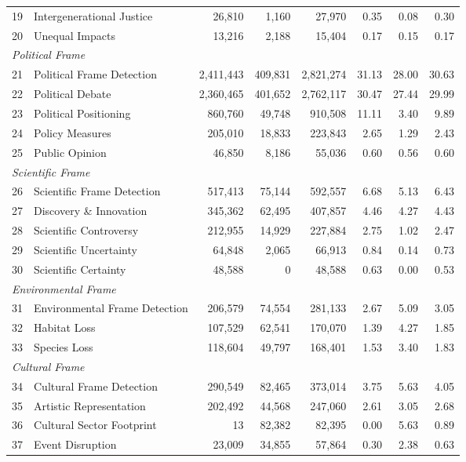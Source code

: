 \documentclass[12pt]{article}
\begin{document}
{\begin{longtable}{p{0.5cm}p{5.5cm}rrrrrr}
19 & Intergenerational Justice & 26,810 & 1,160 & 27,970 & 0.35 & 0.08 & 0.30 \\
20 & Unequal Impacts & 13,216 & 2,188 & 15,404 & 0.17 & 0.15 & 0.17 \\
\midrule
\multicolumn{8}{l}{\textit{Political Frame}} \\
21 & Political Frame Detection & 2,411,443 & 409,831 & 2,821,274 & 31.13 & 28.00 & 30.63 \\
22 & Political Debate & 2,360,465 & 401,652 & 2,762,117 & 30.47 & 27.44 & 29.99 \\
23 & Political Positioning & 860,760 & 49,748 & 910,508 & 11.11 & 3.40 & 9.89 \\
24 & Policy Measures & 205,010 & 18,833 & 223,843 & 2.65 & 1.29 & 2.43 \\
25 & Public Opinion & 46,850 & 8,186 & 55,036 & 0.60 & 0.56 & 0.60 \\
\midrule
\multicolumn{8}{l}{\textit{Scientific Frame}} \\
26 & Scientific Frame Detection & 517,413 & 75,144 & 592,557 & 6.68 & 5.13 & 6.43 \\
27 & Discovery \& Innovation & 345,362 & 62,495 & 407,857 & 4.46 & 4.27 & 4.43 \\
28 & Scientific Controversy & 212,955 & 14,929 & 227,884 & 2.75 & 1.02 & 2.47 \\
29 & Scientific Uncertainty & 64,848 & 2,065 & 66,913 & 0.84 & 0.14 & 0.73 \\
30 & Scientific Certainty & 48,588 & 0 & 48,588 & 0.63 & 0.00 & 0.53 \\
\midrule
\multicolumn{8}{l}{\textit{Environmental Frame}} \\
31 & Environmental Frame Detection & 206,579 & 74,554 & 281,133 & 2.67 & 5.09 & 3.05 \\
32 & Habitat Loss & 107,529 & 62,541 & 170,070 & 1.39 & 4.27 & 1.85 \\
33 & Species Loss & 118,604 & 49,797 & 168,401 & 1.53 & 3.40 & 1.83 \\
\midrule
\multicolumn{8}{l}{\textit{Cultural Frame}} \\
34 & Cultural Frame Detection & 290,549 & 82,465 & 373,014 & 3.75 & 5.63 & 4.05 \\
35 & Artistic Representation & 202,492 & 44,568 & 247,060 & 2.61 & 3.05 & 2.68 \\
36 & Cultural Sector Footprint & 13 & 82,382 & 82,395 & 0.00 & 5.63 & 0.89 \\
37 & Event Disruption & 23,009 & 34,855 & 57,864 & 0.30 & 2.38 & 0.63 \\

\end{longtable}}
\end{document}
